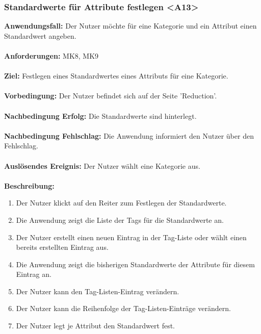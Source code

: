 \documentclass[parskip=full]{scrartcl} %
\begin{document}
\subsubsection*{Standardwerte für Attribute festlegen <A13>}
\textbf{Anwendungsfall:} Der Nutzer möchte für eine Kategorie und ein Attribut einen Standardwert angeben.\\\\
\textbf{Anforderungen:} MK8, MK9\\\\
\textbf{Ziel:} Festlegen eines Standardwertes eines Attributs für eine Kategorie. \\\\
\textbf{Vorbedingung:} Der Nutzer befindet sich auf der Seite 'Reduction'. \\\\
\textbf{Nachbedingung Erfolg:} Die Standardwerte sind hinterlegt. \\\\
\textbf{Nachbedingung Fehlschlag:} Die Anwendung informiert den Nutzer über den Fehlschlag. \\\\
\textbf{Auslösendes Ereignis:} Der Nutzer wählt eine Kategorie aus. \\\\
\textbf{Beschreibung:}
\begin{enumerate}
    \item Der Nutzer klickt auf den Reiter zum Festlegen der Standardwerte.
    \item Die Anwendung zeigt die Liste der Tags für die Standardwerte an.
    \item Der Nutzer erstellt einen neuen Eintrag in der Tag-Liste oder wählt einen bereits erstellten Eintrag aus.
    \item Die Anwendung zeigt die bisherigen Standardwerte der Attribute für diesem Eintrag an.
    \item Der Nutzer kann den Tag-Listen-Eintrag verändern.
    \item Der Nutzer kann die Reihenfolge der Tag-Listen-Einträge verändern.
    \item Der Nutzer legt je Attribut den Standardwert fest.
\end{enumerate}
\newpage
\end{document}
